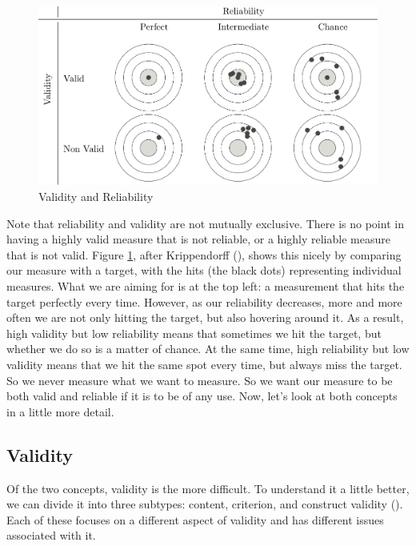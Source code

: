 \documentclass[
]{book}
\begin{document}
\begin{figure}
\includegraphics[width=1\linewidth]{figure/validity-reliability} \caption{Validity and Reliability}\label{fig:validity}
\end{figure}

Note that reliability and validity are not mutually exclusive. There is no point in having a highly valid measure that is not reliable, or a highly reliable measure that is not valid. Figure \ref{fig:validity}, after Krippendorff (), shows this nicely by comparing our measure with a target, with the hits (the black dots) representing individual measures. What we are aiming for is at the top left: a measurement that hits the target perfectly every time. However, as our reliability decreases, more and more often we are not only hitting the target, but also hovering around it. As a result, high validity but low reliability means that sometimes we hit the target, but whether we do so is a matter of chance. At the same time, high reliability but low validity means that we hit the same spot every time, but always miss the target. So we never measure what we want to measure. So we want our measure to be both valid and reliable if it is to be of any use. Now, let's look at both concepts in a little more detail.

\subsection{Validity}\label{validity}

Of the two concepts, validity is the more difficult. To understand it a little better, we can divide it into three subtypes: content, criterion, and construct validity (). Each of these focuses on a different aspect of validity and has different issues associated with it.
\end{document}
